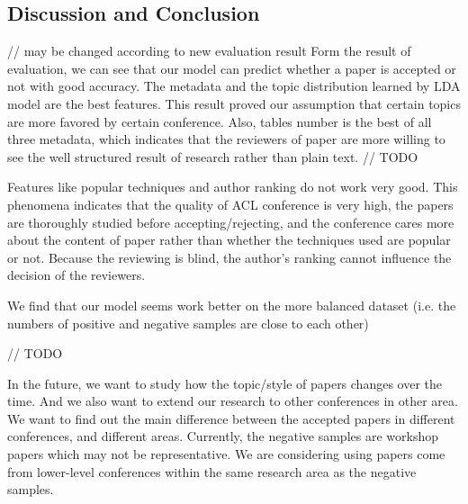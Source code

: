 \documentclass[11pt,letterpaper]{article}
\begin{document}
\subsection{Discussion and Conclusion} 

// may be changed according to new evaluation result
Form the result of evaluation, we can see that our model can predict whether a paper is accepted or not with good accuracy. The metadata and the topic distribution learned by LDA model are the best features. This result proved our assumption that certain topics are more favored by certain conference. Also, tables number is the best of all three metadata, which indicates that the reviewers of paper are more willing to see the well structured result of research rather than plain text. // TODO 

Features like popular techniques and author ranking do not work very good. This phenomena indicates that the quality of ACL conference is very high, the papers are thoroughly studied before accepting/rejecting, and the conference cares more about the content of paper rather than whether the techniques used are popular or not. Because the reviewing is blind, the author’s ranking cannot influence the decision of the reviewers. 

We find that our model seems work better on the more balanced dataset (i.e. the numbers of positive and negative samples are close to each other)

// TODO


In the future, we want to study how the topic/style of papers changes over the time. And we also want to extend our research to other conferences in other area. We want to find out the main difference between the accepted papers in different conferences, and different areas. 
Currently, the negative samples are workshop papers which may not be representative.  We are considering using papers come from lower-level conferences within the same research area as the negative samples. 
\end{document}
